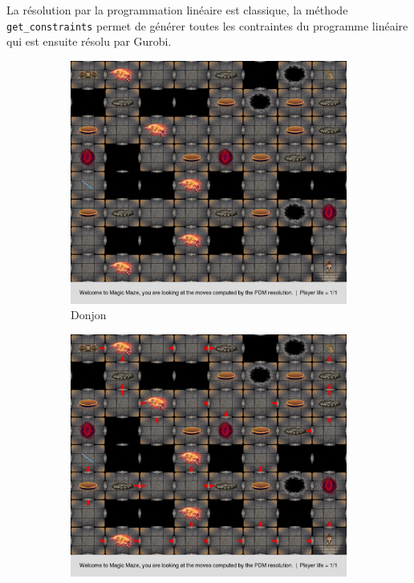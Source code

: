 \documentclass[a4paper]{article}
\theoremstyle{plain}
\begin{document}
La résolution par la programmation linéaire est classique, la méthode \texttt{get\_constraints} permet de générer toutes les contraintes du programme linéaire qui est ensuite résolu par Gurobi. \\
\begin{figure}
	\centering
	\begin{subfigure}[b]{0.48\textwidth}
		\includegraphics[width=\textwidth]{dungeonSujet.jpeg}
		\caption{Donjon}
	\end{subfigure}
	\begin{subfigure}[b]{0.48\textwidth}
		\includegraphics[width=\textwidth]{dungeonSujet_solTres.jpeg}

\end{subfigure}
\end{figure}
\end{document}
